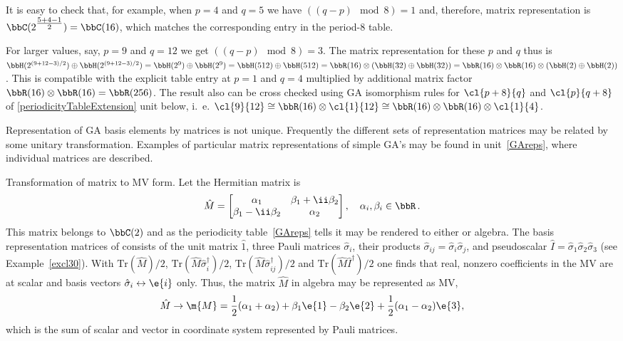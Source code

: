 %
\begin{example}
It is easy to check that, for example, when $p=4$ and $q=5$ we
have $((q-p)\mod 8) = 1$ and, therefore, matrix representation is
$\bbC(2^{\tfrac{5+4-1}{2}})=\bbC(16)$, which matches the
corresponding entry in the period-8 table.

For larger values, say, $p=9$ and $q=12$ we get $((q-p)\mod 8)
=3$. The matrix representation for these $p$ and $q$ thus is
$\bbH(2^{(9+12-3)/2})\oplus\bbH(2^{(9+12-3)/2})=\bbH(2^{9})\oplus\bbH(2^{9})=\bbH(512)\oplus\bbH(512)=\bbR(16)\otimes(\bbH(32)\oplus\bbH(32))=
\bbR(16)\otimes\bbR(16)\otimes(\bbH(2)\oplus\bbH(2))$. This is
compatible with the explicit table entry at $p=1$ and $q=4$
multiplied by  additional matrix factor
$\bbR(16)\otimes\bbR(16)=\bbR(256)$. The result also can be
cross checked using GA isomorphism rules for $\cl{p+8}{q}$ and
$\cl{p}{q+8}$ of \ref{periodicityTableExtension} unit below, i.~e.
$\cl{9}{12}\cong
\bbR(16)\otimes\cl{1}{12}\cong\bbR(16)\otimes\bbR(16)\otimes\cl{1}{4}$.
\end{example}
\vspace{2mm} Representation of GA basis elements by matrices is not
unique. Frequently the different sets of representation matrices
may be related by some unitary transformation. Examples of
particular matrix representations of simple GA's may be found in
unit~\ref{GAreps}, where individual matrices are described.
%
\begin{example} Transformation of  matrix to MV form. Let the
Hermitian matrix is
\[\hat{M}=\begin{bmatrix}
\alpha_1&\beta_1+\ii\beta_2\\
\beta_1-\ii\beta_2&\alpha_2\\
\end{bmatrix},\quad\alpha_i,\beta_i\in\bbR  \,.\]
This  matrix belongs to $\bbC(2)$ and as the periodicity
table~\ref{GAreps} tells it may be rendered to either  or
 algebra. The basis representation matrices of 
consists of the unit matrix $\hat{1}$, three Pauli matrices
$\hat{\sigma}_i$, their products
$\hat{\sigma}_{ij}=\hat{\sigma}_i\hat{\sigma}_j$, and pseudoscalar
$\hat{I}=\hat{\sigma}_1\hat{\sigma}_2\hat{\sigma}_3$ (see
Example~\ref{excl30}). With $\textrm{Tr}(\hat{M})/2$,
$\textrm{Tr}(\hat{M}\hat{\sigma}_i^{\dagger})/2$,
$\textrm{Tr}(\hat{M}\hat{\sigma}_{ij}^{\dagger})/2$ and
$\textrm{Tr}(\hat{M}\hat{I}^{\dagger})/2$ one finds that real,
nonzero coefficients in the MV are at scalar and basis vectors
$\hat{\sigma}_i\leftrightarrow\e{i}$ only. Thus, the matrix
$\hat{M}$ in   algebra may be represented as MV,
\[\hat{M}\rightarrow\m{M}=\frac12(\alpha_1+\alpha_2)+\beta_1\e{1}-\beta_2\e{2}+\frac12(\alpha_1-\alpha_2)\e{3},\]
which is the sum of  scalar and vector in coordinate system
represented by Pauli matrices.
\end{example}
%
